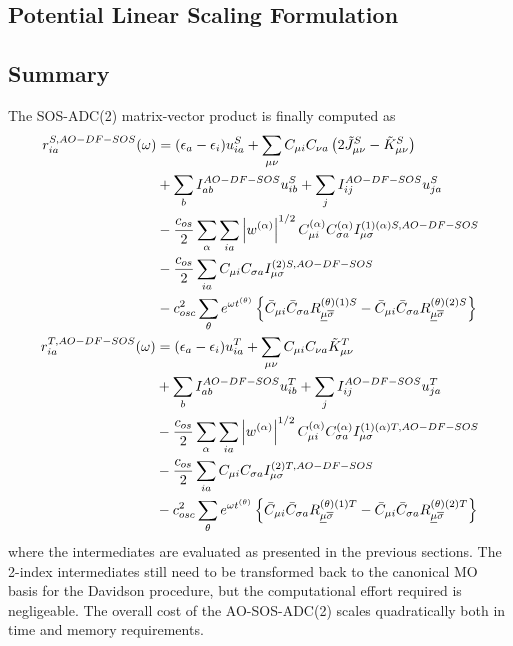\subsection{Potential Linear Scaling Formulation}

\subsection{Summary}

The SOS-ADC(2) matrix-vector product is finally computed as
\begin{align}
\begin{split}
r_{ia}^{S,AO-DF-SOS}(\omega) &= (\epsilon_a - \epsilon_i) u_{ia}^S + \sum_{\mu\nu} C_{\mu i} C_{\nu a} \left( 2\tilde{J}^S_{\mu\nu} - \tilde{K}^S_{\mu\nu} \right) \\
&+ \sum_b I_{ab}^{AO-DF-SOS} u_{ib}^S + \sum_j I_{ij}^{AO-DF-SOS} u_{ja}^S \\
&- \frac{c_{os}}{2} \sum_{\alpha} \sum_{ia} \left\lvert w^{(\alpha)} \right\rvert^{1/2} C_{\mu i}^{(\alpha)} C_{\sigma a}^{(\alpha)} I_{\mu\sigma}^{(1)(\alpha)S,AO-DF-SOS} \\
&- \frac{c_{os}}{2} \sum_{ia} C_{\mu i} C_{\sigma a} I_{\mu\sigma}^{(2)S,AO-DF-SOS} \\
&- c_{osc}^2 \sum_{\theta} e^{\omega t^{(\theta)}} \left\lbrace \bar{C}_{\mu i} \bar{C}_{\sigma a} R^{(\theta)(1)S}_{\underline{\mu}\overline{\sigma}} - \bar{C}_{\mu i} \bar{C}_{\sigma a} R^{(\theta)(2)S}_{\underline{\mu}\overline{\sigma}} \right\rbrace
\end{split}
\\
\begin{split}
r_{ia}^{T,AO-DF-SOS}(\omega) &= (\epsilon_a - \epsilon_i) u_{ia}^T + \sum_{\mu\nu} C_{\mu i} C_{\nu a} \tilde{K}^T_{\mu\nu} \\
&+ \sum_b I_{ab}^{AO-DF-SOS} u_{ib}^T + \sum_j I_{ij}^{AO-DF-SOS} u_{ja}^T \\
&- \frac{c_{os}}{2} \sum_{\alpha} \sum_{ia} \left\lvert w^{(\alpha)} \right\rvert^{1/2} C_{\mu i}^{(\alpha)} C_{\sigma a}^{(\alpha)} I_{\mu\sigma}^{(1)(\alpha)T,AO-DF-SOS} \\
&- \frac{c_{os}}{2} \sum_{ia} C_{\mu i} C_{\sigma a} I_{\mu\sigma}^{(2)T,AO-DF-SOS} \\
& - c_{osc}^2 \sum_{\theta} e^{\omega t^{(\theta)}} \left\lbrace \bar{C}_{\mu i} \bar{C}_{\sigma a} R^{(\theta)(1)T}_{\underline{\mu}\overline{\sigma}} - \bar{C}_{\mu i} \bar{C}_{\sigma a} R^{(\theta)(2)T}_{\underline{\mu}\overline{\sigma}} \right\rbrace
\end{split}
\end{align}
\noindent where the intermediates are evaluated as presented in the previous sections. The 2-index intermediates still need to be transformed back to the canonical MO basis for the Davidson procedure, but the computational effort required is negligeable. The overall cost of the AO-SOS-ADC(2) scales quadratically both in time and memory requirements.

